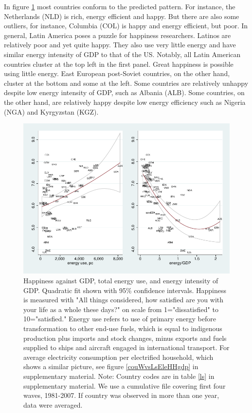 \documentclass[10pt, letterpaper]{article}
\begin{document}
\begin{spacing}{1.4}
In figure \ref{couWvsLsEnePerGdp2} most countries conform to the predicted pattern. 
 For instance,  the Netherlands (NLD) is rich,  energy efficient and happy. But
 there are also some outliers, for instance,  Columbia (COL) is  happy and energy
 efficient,  but poor.  
In general, Latin America poses a puzzle for happiness researchers. Latinos are
relatively poor and yet quite happy. They also use very little  energy and have similar energy intensity of GDP to that of the  US. Notably, all Latin
 American countries cluster at the top left in the
first panel.  Great happiness is possible using little  energy. East European
post-Soviet countries, on the other hand, cluster at the bottom and some at the
left. Some countries are relatively unhappy despite low energy intensity of GDP,
such as Albania (ALB). Some countries, on the other hand, are relatively happy
despite low energy efficiency such as Nigeria (NGA) and Kyrgyzstan (KGZ).    

\begin{figure}[H]
 \includegraphics[width=6in]{graphsAndTables/couWvsLsEnePerGdp2.pdf}\centering \caption{Happiness
   against GDP, total energy use, and energy intensity of GDP. Quadratic fit
   shown with 95\% confidence intervals. Happiness is measured with "All things considered, how satisfied are you with your life as a whole these days?" on scale from 1="dissatisfied" to 10="satisfied." Energy use refers to use of primary energy before transformation to other end-use fuels, which is equal to indigenous production plus imports and stock changes, minus exports and fuels supplied to ships and aircraft engaged in international transport. For average electricity consumption per electrified household, which shows a similar picture, see figure \ref{couWvsLsEleHHgdp} in supplementary material.  Note: Country codes are in table \ref{ls} in supplementary material. We use a cumulative file covering first four waves, 1981-2007. If country was observed in more than one year, data were averaged.}\label{couWvsLsEnePerGdp2} %
\end{figure}



\end{spacing}
\end{document}
